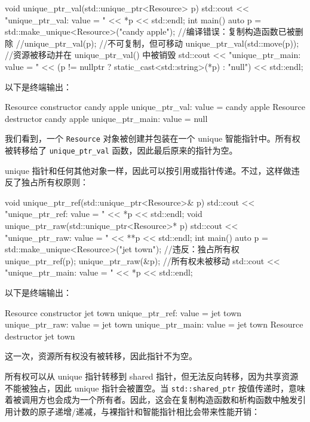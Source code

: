 \begin{codebox}[cpp]
void unique_ptr_val(std::unique_ptr<Resource> p) {
    std::cout << "unique_ptr_val: value = " << *p << std::endl;
}
int main() {
    auto p = std::make_unique<Resource>("candy apple");
    //编译错误：复制构造函数已被删除
    //unique_ptr_val(p);
    //不可复制，但可移动
    unique_ptr_val(std::move(p));
    //资源被移动并在 unique_ptr_val() 中被销毁
    std::cout << "unique_ptr_main: value = "
              << (p != nullptr ? static_cast<std::string>(*p) : "null")
              << std::endl;
}
\end{codebox}

以下是终端输出：

\begin{codebox}[text]
Resource constructor candy apple
unique_ptr_val: value = candy apple
Resource destructor candy apple
unique_ptr_main: value = null
\end{codebox}

我们看到，一个 \texttt{Resource} 对象被创建并包装在一个 unique 智能指针中。所有权被转移给了 \texttt{unique\_\allowbreak{}ptr\_\allowbreak{}val} 函数，因此最后原来的指针为空。

\label{idx:457}
unique 指针和任何其他对象一样，因此可以按引用或指针传递。不过，这样做违反了独占所有权原则：

\begin{codebox}[cpp]
void unique_ptr_ref(std::unique_ptr<Resource>& p) {
    std::cout << "unique_ptr_ref: value = " << *p << std::endl;
}
void unique_ptr_raw(std::unique_ptr<Resource>* p) {
    std::cout << "unique_ptr_raw: value = " << **p << std::endl;
}
int main() {
    auto p = std::make_unique<Resource>("jet town");
    //违反：独占所有权
    unique_ptr_ref(p);
    unique_ptr_raw(&p);
    //所有权未被移动
    std::cout << "unique_ptr_main: value = " << *p << std::endl;
}
\end{codebox}

以下是终端输出：

\begin{codebox}[text]
Resource constructor jet town
unique_ptr_ref: value = jet town
unique_ptr_raw: value = jet town
unique_ptr_main: value = jet town
Resource destructor jet town
\end{codebox}

这一次，资源所有权没有被转移，因此指针不为空。

所有权可以从 unique 指针转移到 shared 指针，但无法反向转移，因为共享资源不能被独占，因此 unique 指针会被置空。当 \texttt{std::\allowbreak{}shared\_\allowbreak{}ptr} 按值传递时，意味着被调用方也会成为一个所有者。因此，这会在复制构造函数和析构函数中触发引用计数的原子递增/递减，与裸指针和智能指针相比会带来性能开销：

